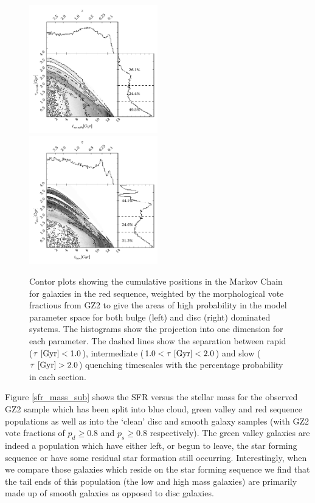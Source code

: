\documentclass[useAMS,usenatbib]{mn2e}
\def\changed    {\color{titlecol} }
\begin{document}
\begin{figure}
\includegraphics[width=0.4975\textwidth]{red_smooth.pdf}
\includegraphics[width=0.4975\textwidth]{red_disc.pdf}
\caption[8pt]{{\changed Contor plots showing the cumulative positions in the Markov Chain for galaxies in the red sequence, weighted by the morphological vote fractious from GZ2 to give the areas of high probability in the model parameter space for both bulge (left) and disc (right) dominated systems. The histograms show the projection into one dimension for each parameter. The dashed lines show the separation between rapid ($\tau ~\rm{[Gyr]} < 1.0$), intermediate ($1.0 < \tau ~\rm{[Gyr]} < 2.0$) and slow ($\tau ~\rm{[Gyr]} > 2.0$) quenching timescales with the percentage probability in each section.}}
\label{red_s}
\end{figure}


Figure \ref{sfr_mass_sub} shows the SFR versus the stellar mass for the observed GZ2 sample which has been split into blue cloud, green valley and red sequence populations as well as into the `clean' disc and smooth galaxy samples (with GZ2 vote fractions of $p_d \geq 0.8$ and $p_s \geq 0.8$ respectively). The green valley galaxies are indeed a population which have either left, or begun to leave, the star forming sequence or have some residual star formation still occurring. Interestingly, when we compare those galaxies which reside on the star forming sequence we find that the tail ends of this population (the low and high mass  galaxies) are primarily made up of smooth galaxies as opposed to disc galaxies.
\end{document}
